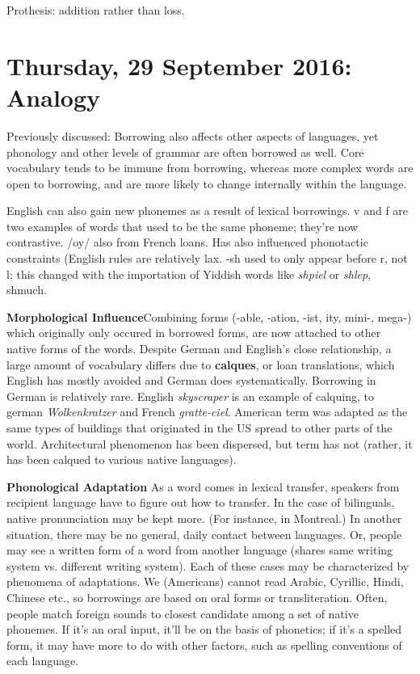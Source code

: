 \documentclass{exam}
\begin{document}
 

Prothesis: addition rather than loss.

\section*{Thursday, 29 September 2016: Analogy}

Previously discussed: Borrowing also affects other aspects of languages, yet phonology and other levels of grammar are often borrowed as well. Core vocabulary tends to be immune from borrowing, whereas more complex words are open to borrowing, and are more likely to change internally within the language. 

English can also gain new phonemes as a result of lexical borrowings. v and f are two examples of words that used to be the same phoneme; they're now contrastive. /oy/ also from French loans. Has also influenced phonotactic constraints (English rules are relatively lax. -sh used to only appear before r, not l; this changed with the importation of Yiddish words like \textit{shpiel} or \textit{shlep}, shmuch.

\textbf{Morphological Influence}Combining forms (-able, -ation, -ist, ity, mini-, mega-) which originally only occured in borrowed forms, are now attached to other native forms of the words. Despite German and English's close relationship, a large amount of vocabulary differs due to \textbf{calques}, or loan translations, which English has mostly avoided and German does systematically. Borrowing in German is relatively rare. English \textit{skyscraper} is an example of calquing, to german \textit{Wolkenkratzer} and French \textit{gratte-ciel}. American term was adapted as the same types of buildings that originated in the US spread to other parts of the world. Architectural phenomenon has been dispersed, but term has not (rather, it has been calqued to various native languages). 

\textbf{Phonological Adaptation} As a word comes in lexical transfer, speakers from recipient language have to figure out how to transfer. In the case of bilinguals, native pronunciation may be kept more. (For instance, in Montreal.) In another situation, there may be no general, daily contact between languages. Or, people may see a written form of a word from another language (shares same writing system vs. different writing system). Each of these cases may be characterized by phenomena of adaptations. We (Americans) cannot read Arabic, Cyrillic, Hindi, Chinese etc., so borrowings are based on oral forms or transliteration. Often, people match foreign sounds to closest candidate among a set of native phonemes. If it's an oral input, it'll be on the basis of phonetics; if it's a spelled form, it may have more to do with other factors, such as spelling conventions of each language. 
\end{document}
